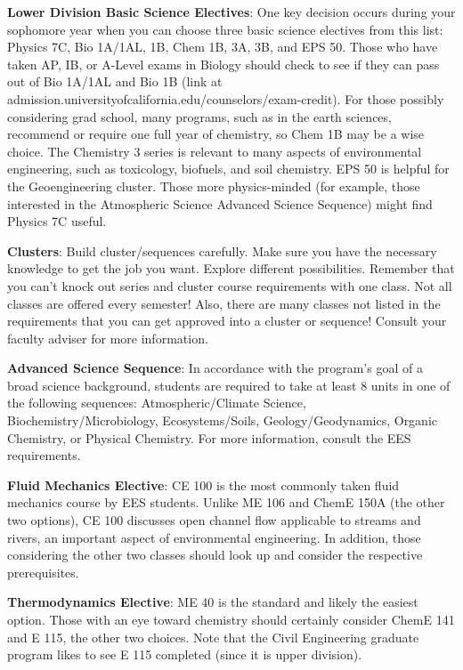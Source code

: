 \textbf{Lower Division Basic Science Electives}: One key decision occurs during your sophomore year when you can choose three basic science electives from this list: Physics 7C, Bio 1A/1AL, 1B, Chem 1B, 3A, 3B, and EPS 50. Those who have taken AP, IB, or A-Level exams in Biology should check to see if they can pass out of Bio 1A/1AL and Bio 1B (link at {\selectfont admission.universityofcalifornia.edu/counselors/exam-credit}). For those possibly considering grad school, many programs, such as in the earth sciences, recommend or require one full year of chemistry, so Chem 1B may be a wise choice. The Chemistry 3 series is relevant to many aspects of environmental engineering, such as toxicology, biofuels, and soil chemistry. EPS 50 is helpful for the Geoengineering cluster. Those more physics-minded (for example, those interested in the Atmospheric Science Advanced Science Sequence) might find Physics 7C useful.

\textbf{Clusters}: Build cluster/sequences carefully. Make sure you have the necessary knowledge to get the job you want. Explore different possibilities. Remember that you can’t knock out series and cluster course requirements with one class. Not all classes are offered every semester! Also, there are many classes not listed in the requirements that you can get approved into a cluster or sequence! Consult your faculty adviser for more information.

\textbf{Advanced Science Sequence}: In accordance with the program’s goal of a broad science background, students are required to take at least 8 units in one of the following sequences: Atmospheric/Climate Science, Biochemistry/Microbiology, Ecosystems/Soils, Geology/Geodynamics, Organic Chemistry, or Physical Chemistry. For more information, consult the EES requirements.

\textbf{Fluid Mechanics Elective}: CE 100 is the most commonly taken fluid mechanics course by EES students. Unlike ME 106 and ChemE 150A (the other two options), CE 100 discusses open channel flow applicable to streams and rivers, an important aspect of environmental engineering. In addition, those considering the other two classes should look up and consider the respective prerequisites.

\textbf{Thermodynamics Elective}: ME 40 is the standard and likely the easiest option. Those with an eye toward chemistry should certainly consider ChemE 141 and E 115, the other two choices. Note that the Civil Engineering graduate program likes to see E 115 completed (since it is upper division).

